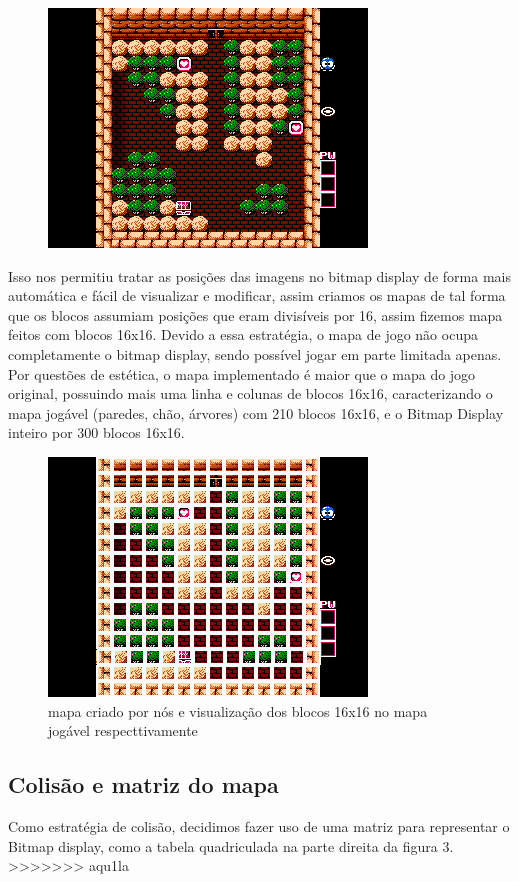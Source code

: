 \documentclass[10pt, conference, compsocconf]{IEEEtran}
\begin{document}
\begin{figure}[htb]
  \begin{center}
   \includegraphics[width=0.3\linewidth]{./Figures/image_5.png}
  \end{center}
  \label{fig:01}
\end{figure}

Isso nos permitiu tratar as posições das imagens no
bitmap display de forma mais automática e fácil de
visualizar e modificar, assim criamos os mapas de tal
forma que os blocos assumiam posições que eram divisíveis por 16, assim fizemos mapa feitos com blocos
16x16. Devido a essa estratégia, o mapa de jogo não
ocupa completamente o bitmap display, sendo possível jogar em parte limitada apenas. Por questões de
estética, o mapa implementado é maior que o mapa
do jogo original, possuindo mais uma linha e colunas de blocos 16x16, caracterizando o mapa jogável
(paredes, chão, árvores) com 210 blocos 16x16, e o
Bitmap Display inteiro por 300 blocos 16x16.

\begin{figure}[htb]
  \begin{center}
   \includegraphics[width=0.3\linewidth]{./Figures/image_6.png}
  \end{center}
  \caption{ mapa criado por nós e visualização dos
blocos 16x16 no mapa jogável respecttivamente}
  \label{fig:01}
\end{figure}


\subsection{Colisão e matriz do mapa}{
\label{sec:Mars}
Como estratégia de colisão, decidimos fazer uso de
uma matriz para representar o Bitmap display, como
a tabela quadriculada na parte direita da figura 3.
>>>>>>> aqu1la

}
\end{document}
